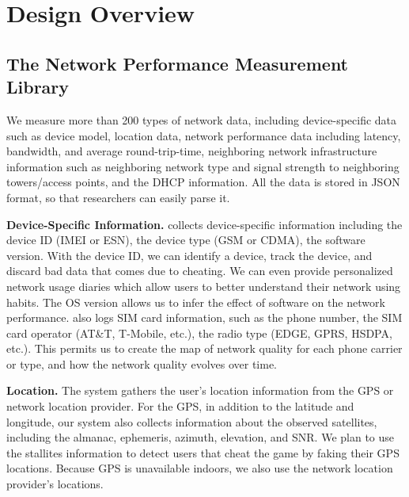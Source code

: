 \section{Design Overview}
\label{s:overview}

\subsection{The Network Performance Measurement Library}
We measure more than 200 types of network data, including device-specific data such as device model, 
location data, network performance data including latency, bandwidth, and average round-trip-time, 
neighboring network infrastructure information such as neighboring network type and signal strength to 
neighboring towers/access points, and the DHCP information. All the data is stored in JSON format, so
that researchers can easily parse it.


{\bfseries Device-Specific Information.} \name{} collects device-specific information including the device ID 
(IMEI or ESN), the device type (GSM or CDMA), the software version. With the device ID, we can 
identify a device, track the device, and discard bad data that comes due to cheating. We can 
even provide personalized network usage diaries which allow users to better understand their network 
using habits.
The OS version allows us to infer the effect of software on the network performance. \name{} also 
logs SIM card information, such as the phone number, the SIM card operator (AT\&T, T-Mobile, etc.),
the radio type (EDGE, GPRS, HSDPA, etc.).
This permits us to create the map of network quality for each phone carrier or type, and how the network quality 
evolves over time.

{\bfseries Location.} The system gathers the user's location information from the GPS or network location provider. 
For the GPS, in addition to the latitude and longitude, our system also collects information 
about the observed satellites, including the almanac, ephemeris, azimuth, elevation, and SNR.
We plan to use the stallites information to detect users that cheat the game by faking their GPS locations.
Because GPS is unavailable indoors, we also use the network location provider's locations.


